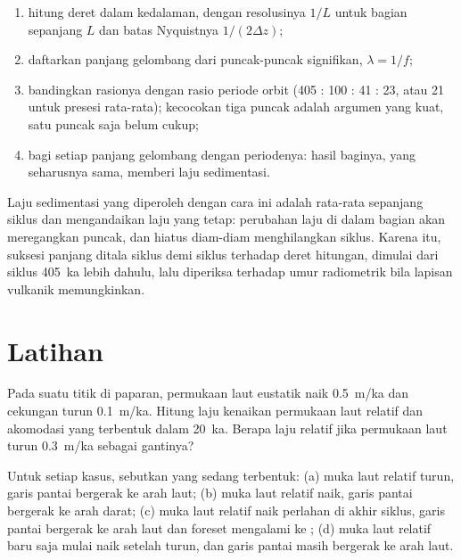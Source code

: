 \begin{method}\label{met:b3:sequence-stratigraphy:cycles}
\begin{enumerate}
\item hitung  deret dalam kedalaman, dengan resolusinya
  $1/L$ untuk bagian sepanjang $L$ dan batas Nyquistnya $1/(2\Delta z)$;
\item daftarkan panjang gelombang dari puncak-puncak signifikan, $\lambda = 1/f$;
\item bandingkan rasionya dengan rasio periode orbit (405 : 100 : 41
  : 23, atau 21 untuk presesi rata-rata); kecocokan tiga puncak adalah
  argumen yang kuat, satu puncak saja belum cukup;
\item bagi setiap panjang gelombang dengan periodenya: hasil baginya, yang seharusnya
  sama, memberi laju sedimentasi.
\end{enumerate}
\end{method}

Laju sedimentasi yang diperoleh dengan cara ini adalah rata-rata sepanjang siklus dan
mengandaikan laju yang tetap: perubahan laju di dalam bagian akan meregangkan
puncak, dan hiatus diam-diam menghilangkan siklus. Karena itu, suksesi panjang
ditala siklus demi siklus terhadap deret hitungan, dimulai dari siklus \qty{405}{ka}
lebih dahulu, lalu diperiksa terhadap umur radiometrik bila lapisan vulkanik memungkinkan.

\section{Latihan}

\begin{exercise}[$\star$]\label{exo:b3:sequence-stratigraphy:1}
Pada suatu titik di paparan, permukaan laut eustatik naik \qty{0.5}{m/ka} dan
cekungan turun \qty{0.1}{m/ka}. Hitung laju kenaikan permukaan laut relatif
dan akomodasi yang terbentuk dalam \qty{20}{ka}. Berapa laju relatif
jika permukaan laut turun \qty{0.3}{m/ka} sebagai gantinya?
\end{exercise}

\begin{exercise}[$\star$]\label{exo:b3:sequence-stratigraphy:2}
Untuk setiap kasus, sebutkan  yang sedang terbentuk: (a) muka laut relatif
turun, garis pantai bergerak ke arah laut; (b) muka laut relatif naik, garis pantai
bergerak ke arah darat; (c) muka laut relatif naik perlahan di akhir
siklus, garis pantai bergerak ke arah laut dan foreset mengalami  ke
; (d) muka laut relatif baru saja mulai naik setelah
turun, dan garis pantai masih bergerak ke arah laut.
\end{exercise}

